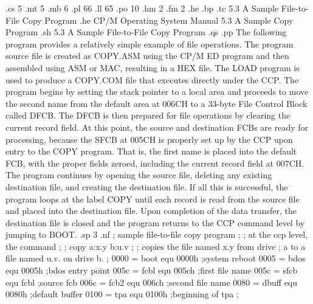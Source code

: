 	
.cs 5
.mt 5
.mb 6
.pl 66
.ll 65
.po 10
.hm 2
.fm 2
.he 
.bp
.tc    5.3  A Sample File-to-File Copy Program
.he CP/M Operating System Manual           5.3  A Sample Copy Program
.sh
5.3  A Sample File-to-File Copy Program
.qs
.pp
The following program provides a relatively simple example of file 
operations.  The program source file is created as COPY.ASM using 
the CP/M ED program and then assembled using ASM or MAC, resulting 
in a HEX file.  The LOAD program is used to produce a COPY.COM 
file that executes directly under the CCP.  The program begins 
by setting the stack pointer to a local area and proceeds to move 
the second name from the default area at 006CH to a 33-byte File 
Control Block called DFCB.  The DFCB is then prepared for file 
operations by clearing the current record  field.  At this point, 
the source and destination FCBs are ready for processing, because 
the SFCB at 005CH is properly set up by the CCP upon entry to the 
COPY program.  That is, the first name is placed into the default 
FCB, with the proper fields zeroed, including the current record 
field at 007CH.  The program continues by opening the source 
file, deleting any existing destination file, and creating the destination 
file.  If all this is successful, the program loops at the label 
COPY until each record is read from the source file and placed into the 
destination file.  Upon completion of the data transfer, the 
destination file is closed and the program returns to the 
CCP command level by jumping to BOOT.
.sp 3
.nf
                                 ;        sample file-to-file copy program   
                                 ;
                                 ;        at the ccp level, the command
                                 ;    
                                 ;             copy a:x.y b:u.v      
                                 ;
                                 ;        copies the file named x.y from drive
                                 ;        a to a file named u.v. on drive b.
                                 ;
     0000 =                      boot     equ 0000h      ;system reboot
     0005 =                      bdos     equ 0005h      ;bdos entry point
     005c =                      fcbl     equ 005ch      ;first file name
     005c =                      sfcb     equ fcbl       ;source fcb
     006c =                      fcb2     equ 006ch      ;second file name
     0080 =                      dbuff    equ 0080h      ;default buffer
     0100 =                      tpa      equ 0100h      ;beginning of tpa
                                 ;

